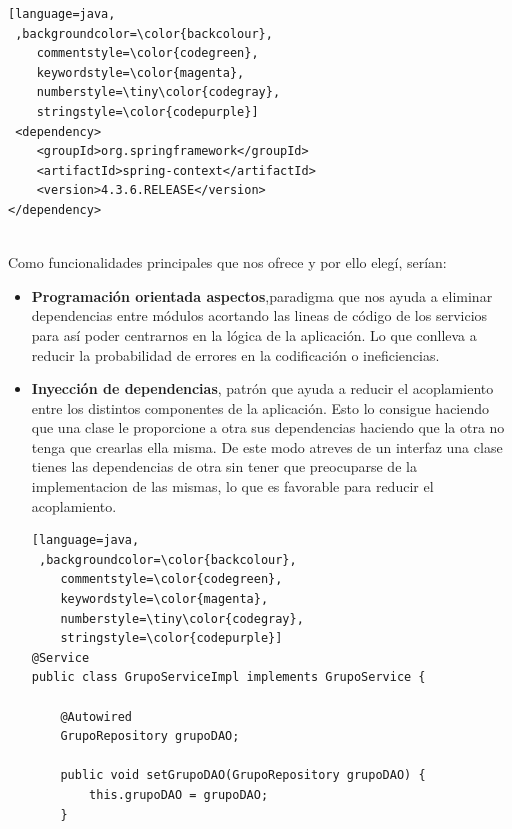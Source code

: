 	
	
	
	
\begin{lstlisting}[language=java,
 ,backgroundcolor=\color{backcolour},   
    commentstyle=\color{codegreen},
    keywordstyle=\color{magenta},
    numberstyle=\tiny\color{codegray},
    stringstyle=\color{codepurple}]
 <dependency>
	<groupId>org.springframework</groupId>
	<artifactId>spring-context</artifactId>
	<version>4.3.6.RELEASE</version>
</dependency>


\end{lstlisting} 	
	
	
	
	
	
	
	
	
	
Como funcionalidades principales que nos ofrece y por ello elegí, serían:

\begin{itemize}
\item \textbf{Programación orientada aspectos},paradigma que nos ayuda a eliminar dependencias entre módulos acortando las lineas de código de los servicios para así poder centrarnos en la lógica de la aplicación. Lo que conlleva a reducir  la probabilidad de errores en la codificación o ineficiencias.


\item\textbf{ Inyección de dependencias}, patrón que ayuda a reducir el acoplamiento entre los distintos componentes de la aplicación. Esto lo consigue haciendo que una clase le proporcione a otra sus dependencias haciendo que la otra no tenga que crearlas ella misma. De este modo atreves de un interfaz una clase tienes las dependencias de otra sin tener que preocuparse de la implementacion de las mismas, lo que es favorable para reducir el acoplamiento.





\begin{lstlisting}[language=java,
 ,backgroundcolor=\color{backcolour},   
    commentstyle=\color{codegreen},
    keywordstyle=\color{magenta},
    numberstyle=\tiny\color{codegray},
    stringstyle=\color{codepurple}]  
@Service
public class GrupoServiceImpl implements GrupoService {

	@Autowired
	GrupoRepository grupoDAO;

	public void setGrupoDAO(GrupoRepository grupoDAO) {
		this.grupoDAO = grupoDAO;
	}


\end{lstlisting} 



\end{itemize}


